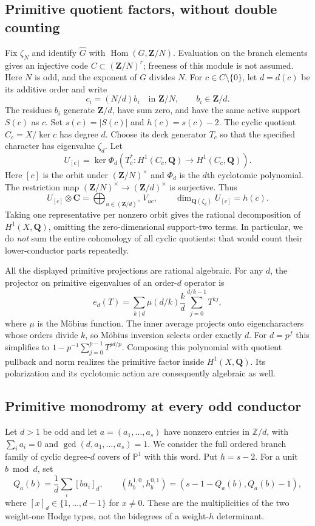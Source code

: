 \documentclass[11pt]{article}
\theoremstyle{definition}
\newcommand{\Q}{\mathbf Q}
\newcommand{\C}{\mathbf C}
\newcommand{\Z}{\mathbf Z}
\newcommand{\Hom}{\operatorname{Hom}}
\begin{document}
\subsection{Primitive quotient factors, without double counting}
Fix $\zeta_N$ and identify $\widehat G$ with
$\Hom(G,\Z/N)$. Evaluation on the branch elements gives an injective
code $C\subset(\Z/N)^r$; freeness of this module is not assumed.
Here $N$ is odd, and the exponent of $G$ divides $N$.
For $c\in C\setminus\{0\}$, let $d=d(c)$ be its additive order and
write
\[
 c_i=(N/d)b_i\quad\text{in }\Z/N,
 \qquad b_i\in\Z/d.
\]
The residues $b_i$ generate $\Z/d$, have sum zero, and have the same
active support $S(c)$ as $c$. Set $s(c)=|S(c)|$ and $h(c)=s(c)-2$.
The cyclic quotient $C_c=X/\ker c$ has degree $d$. Choose its deck
generator $T_c$ so that the specified character has eigenvalue
$\zeta_d$. Let
\[
 U_{[c]}=\ker\Phi_d(T_c^*:H^1(C_c,\Q)\longrightarrow H^1(C_c,\Q)).
\]
Here $[c]$ is the orbit under $(\Z/N)^\times$ and $\Phi_d$ is the
$d$th cyclotomic polynomial. The restriction map
$(\Z/N)^\times\to(\Z/d)^\times$ is surjective. Thus
\[
 U_{[c]}\otimes\C=\bigoplus_{u\in(\Z/d)^\times}V_{uc},
 \qquad \dim_{\Q(\zeta_d)}U_{[c]}=h(c).
\]
Taking one representative per nonzero orbit gives the rational
decomposition of $H^1(X,\Q)$, omitting the zero-dimensional support-two
terms. In particular, we do \emph{not} sum the entire cohomology of all
cyclic quotients: that would count their lower-conductor parts repeatedly.

All the displayed primitive projections are rational algebraic. For
any $d$, the projector on primitive eigenvalues of an order-$d$ operator is
\begin{equation}\label{eq:ppprimitive}
 e_d(T)=\sum_{k\mid d}\mu(d/k)\frac{k}{d}
                  \sum_{j=0}^{d/k-1}T^{kj},
\end{equation}
where $\mu$ is the M\"obius function. The inner average projects onto
eigencharacters whose orders divide $k$, so M\"obius inversion selects
order exactly $d$. For $d=p^f$ this simplifies to
$1-p^{-1}\sum_{j=0}^{p-1}T^{j d/p}$.
Composing this polynomial with quotient pullback and norm
realizes the primitive factor inside $H^1(X,\Q)$. Its polarization and
its cyclotomic action are consequently algebraic as well.

\subsection{Primitive monodromy at every odd conductor}
Let $d>1$ be odd and let $a=(a_1,\ldots,a_s)$ have nonzero entries in
$\mathbb Z/d$, with $\sum_i a_i=0$ and
$\gcd(d,a_1,\ldots,a_s)=1$. We consider the full ordered branch family
of cyclic degree-$d$ covers of $\mathbb P^1$ with this word. Put $h=s-2$.
For a unit $b\bmod d$, set
\[
 Q_a(b)=\frac1d\sum_i[ba_i]_d,\qquad
 (h^{1,0}_b,h^{0,1}_b)=(s-1-Q_a(b),Q_a(b)-1),
\]
where $[x]_d\in\{1,\ldots,d-1\}$ for $x\ne0$.
These are the multiplicities of the two weight-one Hodge types,
not the bidegrees of a weight-$h$ determinant.
\end{document}
